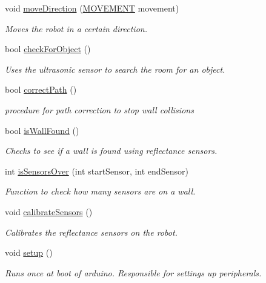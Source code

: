 \begin{DoxyCompactItemize}
void \hyperlink{robotcode_8ino_af776ff77e94170ec456760c6962020e5}{move\+Direction} (\hyperlink{robotcode_8ino_adc716dd21485bffb9015eaeb3cfe6859}{M\+O\+V\+E\+M\+E\+N\+T} movement)
\begin{DoxyCompactList}\small\item\em Moves the robot in a certain direction. \end{DoxyCompactList}\item 
bool \hyperlink{robotcode_8ino_ad8fb70ddbf7925148a848bd3c1df2b94}{check\+For\+Object} ()
\begin{DoxyCompactList}\small\item\em Uses the ultrasonic sensor to search the room for an object. \end{DoxyCompactList}\item 
bool \hyperlink{robotcode_8ino_abd77e61b6e1d72ce91e71cdbd86e3724}{correct\+Path} ()
\begin{DoxyCompactList}\small\item\em procedure for path correction to stop wall collisions \end{DoxyCompactList}\item 
bool \hyperlink{robotcode_8ino_a2d3a70671b195d39ddeb7a437b85d957}{is\+Wall\+Found} ()
\begin{DoxyCompactList}\small\item\em Checks to see if a wall is found using reflectance sensors. \end{DoxyCompactList}\item 
int \hyperlink{robotcode_8ino_a7a14e59caf883ee2936af076b102c68e}{is\+Sensors\+Over} (int start\+Sensor, int end\+Sensor)
\begin{DoxyCompactList}\small\item\em Function to check how many sensors are on a wall. \end{DoxyCompactList}\item 
void \hyperlink{robotcode_8ino_a11b381faabbecc0143d11cf09e955462}{calibrate\+Sensors} ()
\begin{DoxyCompactList}\small\item\em Calibrates the reflectance sensors on the robot. \end{DoxyCompactList}\item 
void \hyperlink{robotcode_8ino_a4fc01d736fe50cf5b977f755b675f11d}{setup} ()
\begin{DoxyCompactList}\small\item\em Runs once at boot of arduino. Responsible for settings up peripherals. \end{DoxyCompactList}\item 

\end{DoxyCompactItemize}
